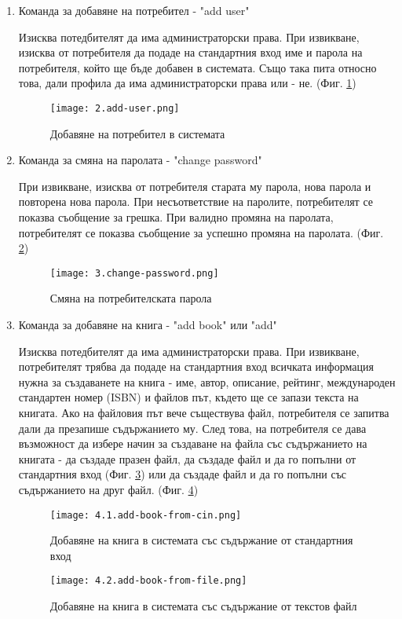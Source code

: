 \begin{enumerate}
    \item Команда за добавяне на потребител - "add user"
    
    Изисква потедбителят да има администраторски права. При извикване, изисква от потребителя да подаде на стандартния вход име и парола на потребителя, който ще бъде добавен в системата. Също така пита относно това, дали профила да има администраторски права или - не. (Фиг. \ref{fig:add-user})
    \begin{figure}[H]
        \texttt{[image: 2.add-user.png]}
        \centering
        \caption{Добавяне на потребител в системата}
        \label{fig:add-user}
    \end{figure}
    
    \item Команда за смяна на паролата - "change password"
    
    При извикване, изисква от потребителя старата му парола, нова парола и повторена нова парола. При несъответствие на паролите, потребителят се показва съобщение за грешка. При валидно промяна на паролата, потребителят се показва съобщение за успешно промяна на паролата. (Фиг. \ref{fig:change-password})
    \begin{figure}[H]
        \texttt{[image: 3.change-password.png]}
        \centering
        \caption{Смяна на потребителската парола}
        \label{fig:change-password}
    \end{figure}
    
    \item Команда за добавяне на книга - "add book" или "add"
    
    Изисква потедбителят да има администраторски права. При извикване, потребителят трябва да подаде на стандартния вход всичката информация нужна за създаванете на книга - име, автор, описание, рейтинг, международен стандартен номер (ISBN) и файлов път, където ще се запази текста на книгата. Ако на файловия път вече съществува файл, потребителя се запитва дали да презапише съдържанието му. След това, на потребителя се дава възможност да избере начин за създаване на файла със съдържанието на книгата - да създаде празен файл, да създаде файл и да го попълни от стандартния вход (Фиг. \ref{fig:add-book-from-cin}) или да създаде файл и да го попълни със съдържанието на друг файл. (Фиг. \ref{fig:add-book-from-file})
    \begin{figure}[H]
        \texttt{[image: 4.1.add-book-from-cin.png]}
        \centering
        \caption{Добавяне на книга в системата със съдържание от стандартния вход}
        \label{fig:add-book-from-cin}
    \end{figure}
    \begin{figure}[H]
        \texttt{[image: 4.2.add-book-from-file.png]}
        \centering
        \caption{Добавяне на книга в системата със съдържание от текстов файл}
        \label{fig:add-book-from-file}
    \end{figure}
    

\end{enumerate}
